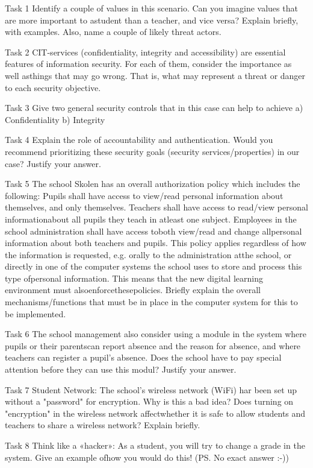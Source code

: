 Task 1
Identify a couple of values in this scenario. Can you imagine values that are more important to astudent than a teacher, and vice versa? Explain briefly, with examples. Also, name a couple of likely threat actors.

Task 2
CIT-services (confidentiality, integrity and accessibility) are essential features of information security. For each of them, consider the importance as well asthings that may go wrong. That is, what may represent a threat or danger to each security objective.

Task 3
Give two general security controls that in this case can help to achieve
	a) Confidentiality
	b) Integrity

Task 4
Explain the role of accountability and authentication. Would you recommend prioritizing these security goals (security services/properties) in our case? Justify your answer.

Task 5
The school Skolen has an overall authorization policy which includes the following:
	Pupils shall have access to view/read personal information about themselves, and only themselves.
	Teachers shall have access to read/view personal informationabout all pupils they teach in atleast one subject.
	Employees in the school administration shall have access toboth view/read and change allpersonal information about both teachers and pupils.
This policy applies regardless of how the information is requested, e.g. orally to the administration atthe school, or directly in one of the computer systems the school uses to store and process this type ofpersonal information. This means that the new digital learning environment must alsoenforcethesepolicies. Briefly explain the overall mechanisms/functions that must be in place in the computer system for this to be implemented.

Task 6
The school management also consider using a module in the system where pupils or their parentscan report absence and the reason for absence, and where teachers can register a pupil’s absence. Does the school have to pay special attention before they can use this modul? Justify your answer.

Task 7
Student Network: The school’s wireless network (WiFi) har been set up without a "password" for encryption. Why is this a bad idea? Does turning on "encryption" in the wireless network affectwhether it is safe to allow students and teachers to share a wireless network? Explain briefly.

Task 8
Think like a «hacker»: As a student, you will try to change a grade in the system. Give an example ofhow you would do this! (PS. No exact answer :-))